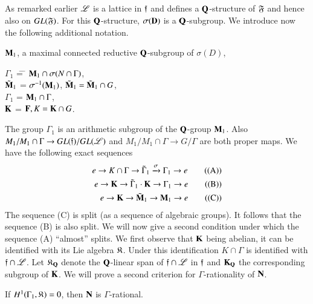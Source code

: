 \setcounter{subsection}{5}
\subsection{}\label{art9-subsec5.6}
As remarked earlier $\mathscr{L}$ is a lattice in $\mathfrak{f}$ and defines a $\mathbf{Q}$-structure of $\mathfrak{F}$ and hence also on $GL (\mathfrak{F})$.  For this $\mathbf{Q}$-structure, $\sigma (\mathbf{D})$ is a $\mathbf{Q}$-subgroup. We introduce now the following additional notation.

$\mathbf{M}_1$, a maximal connected reductive $\mathbf{Q}$-subgroup of $\sigma (D)$,
\begin{tabbing}
$\Gamma_1$ \= = \= $\mathbf{M}_1 \cap \sigma (N\cap \Gamma)$,\\[0.1cm]
$\tilde{\mathbf{M}}_1$ \> = \> $\sigma^{-1} (\mathbf{M}_1)$, $\tilde{\mathbf{M}}_1 = \tilde{\mathbf{M}}_1 \cap G$,\\[0.1cm]
$\Gamma_1$ \> = \> $\mathbf{M}_1 \cap \Gamma$,\\[0.1cm]
$\mathbf{K}$ \> = \>  $\mathbf{F}, K = \mathbf{K} \cap G$.
\end{tabbing}
The group $\Gamma_1$ is an arithmetic subgroup of the $\mathbf{Q}$-group $\mathbf{M}_1$. Also $M_1 / M_1 \cap \Gamma  \to GL (\mathfrak{f})/ GL (\mathscr{L})$ and $M_1/ M_1 \cap \Gamma \to G / \Gamma$ are both proper maps. We have the following exact sequences 
\begin{align*}
e \to K \cap \Gamma \to \tilde{\Gamma}_1 \xrightarrow{\sigma} \Gamma_1 \to e \tag{(A)}\\
e \to \mathbf{K} \to \tilde{\Gamma}_1 \cdot \mathbf{K} \to \Gamma_1 \to e \tag{(B)}\\
e \to \mathbf{K} \to \tilde{\mathbf{M}}_1 \to \mathbf{M}_1 \to e \tag{(C)}
\end{align*}
The sequence (C) is split (as a sequence of algebraic groups). It follows that the sequence (B) is also split. We will now give a second condition under which the sequence (A) ``almost'' splits. We first observe that $\mathbf{K}$ being abelian, it can be identified with its Lie algebra $\mathfrak{K}$. Under this identification $K \cap \Gamma$ is identified with $\mathfrak{f} \cap \mathscr{L}$. Let $\mathfrak{K}_{\mathbf{Q}}$ denote the $\mathbf{Q}$-linear span of $\mathfrak{f} \cap \mathscr{L}$ in $\mathfrak{f}$ and $\mathbf{K}_{\mathbf{Q}}$ the corresponding subgroup of $\mathbf{K}$. We will prove a second criterion for $\Gamma$-rationality of $\mathbf{N}$.

\begin{proposition}\label{art9-prop5.7}
If $H^1 (\Gamma_1, \mathfrak{K})=0$, then $\mathbf{N}$ is $\Gamma$-rational.
\end{proposition}

